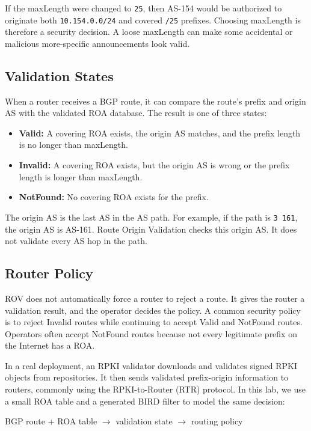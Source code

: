 If the maxLength were changed to \texttt{25}, then AS-154 would be authorized
to originate both \texttt{10.154.0.0/24} and covered \texttt{/25} prefixes.
Choosing maxLength is therefore a security decision. A loose maxLength can make
some accidental or malicious more-specific announcements look valid.

\subsection{Validation States}

When a router receives a BGP route, it can compare the route's prefix and origin
AS with the validated ROA database. The result is one of three states:

\begin{itemize}[noitemsep]
\item \textbf{Valid:} A covering ROA exists, the origin AS matches, and the
      prefix length is no longer than maxLength.
\item \textbf{Invalid:} A covering ROA exists, but the origin AS is wrong or
      the prefix length is longer than maxLength.
\item \textbf{NotFound:} No covering ROA exists for the prefix.
\end{itemize}

The origin AS is the last AS in the AS path. For example, if the path is
\texttt{3 161}, the origin AS is AS-161. Route Origin Validation checks this
origin AS. It does not validate every AS hop in the path.

\subsection{Router Policy}

ROV does not automatically force a router to reject a route. It gives the router
a validation result, and the operator decides the policy. A common security
policy is to reject Invalid routes while continuing to accept Valid and NotFound
routes. Operators often accept NotFound routes because not every legitimate
prefix on the Internet has a ROA.

In a real deployment, an RPKI validator downloads and validates signed RPKI
objects from repositories. It then sends validated prefix-origin information to
routers, commonly using the RPKI-to-Router (RTR) protocol. In this lab, we use a
small ROA table and a generated BIRD filter to model the same decision:

\begin{center}
BGP route + ROA table $\rightarrow$ validation state $\rightarrow$ routing policy
\end{center}

